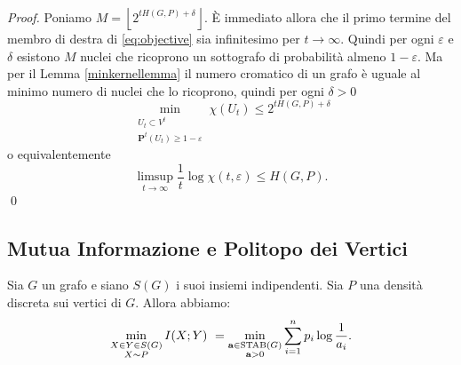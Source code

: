 \begin{proof}
  Poniamo \(M=\left\lfloor 2^{tH(G,P)+\delta}\right\rfloor\). È immediato allora che il primo termine del membro di destra di \eqref{eq:objective} sia infinitesimo per \(t\to \infty\). Quindi per ogni \(\varepsilon\) e \(\delta\) esistono \(M\) nuclei che ricoprono un sottografo di probabilità almeno \(1-\varepsilon\). Ma per il Lemma \ref{minkernellemma} il numero cromatico di un grafo è uguale al minimo numero di nuclei che lo ricoprono, quindi per ogni \(\delta>0\)
  \[\min_{\substack{U_{t}\subset V^{t}\\
      \mathbf{P}^t(U_{t})\ge 1-\varepsilon}} \chi(U_{t})\le 2^{tH(G,P)+\delta}\]
  o equivalentemente
  \[\limsup_{t\to \infty}\frac{1}{t} \log{\chi({t,\varepsilon})}\le H(G,P).\]
  \qed 
\end{proof}

\subsection{Mutua Informazione e Politopo dei Vertici} 
\begin{theorem}
   Sia \(G\) un grafo e siano \(S(G)\) i suoi insiemi indipendenti. Sia \(P\) una densità discreta sui vertici di \(G\). Allora abbiamo:
  \[\min_{\substack{X\in Y\in S(G) \\
      X\sim P}} I(X;Y)\ = \min_{\substack{\mathbf{a}\in \text{\text{STAB}}(G) \\
      \mathbf{a}>0}} \sum_{i=1}^n p_i\log{\frac{1}{a_i}}\text{.}\]
\end{theorem}
